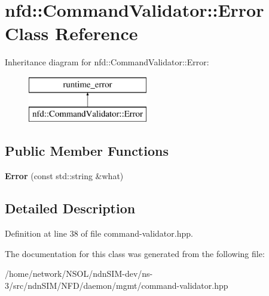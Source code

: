 \hypertarget{classnfd_1_1CommandValidator_1_1Error}{}\section{nfd\+:\+:Command\+Validator\+:\+:Error Class Reference}
\label{classnfd_1_1CommandValidator_1_1Error}
Inheritance diagram for nfd\+:\+:Command\+Validator\+:\+:Error\+:\begin{figure}[H]
\begin{center}
\leavevmode
\includegraphics[height=2.000000cm]{classnfd_1_1CommandValidator_1_1Error}
\end{center}
\end{figure}
\subsection*{Public Member Functions}
\begin{DoxyCompactItemize}
\item 
{\bfseries Error} (const std\+::string \&what)\hypertarget{classnfd_1_1CommandValidator_1_1Error_ab77039ae5e0959098543529072d0159a}{}\label{classnfd_1_1CommandValidator_1_1Error_ab77039ae5e0959098543529072d0159a}

\end{DoxyCompactItemize}


\subsection{Detailed Description}


Definition at line 38 of file command-\/validator.\+hpp.



The documentation for this class was generated from the following file\+:\begin{DoxyCompactItemize}
\item 
/home/network/\+N\+S\+O\+L/ndn\+S\+I\+M-\/dev/ns-\/3/src/ndn\+S\+I\+M/\+N\+F\+D/daemon/mgmt/command-\/validator.\+hpp\end{DoxyCompactItemize}
